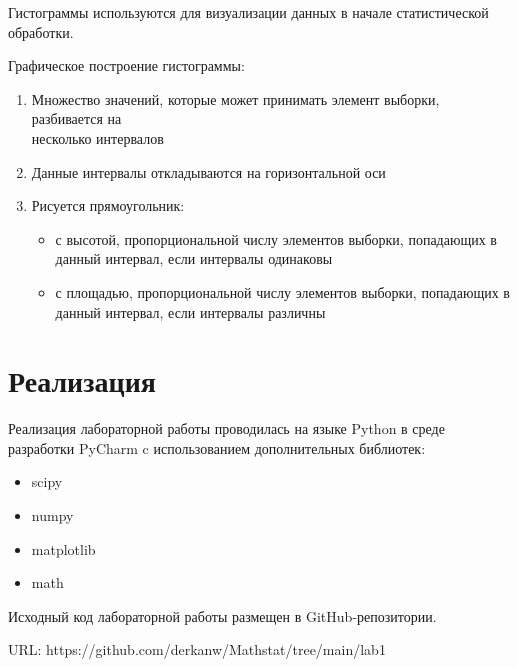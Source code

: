 ﻿\documentclass[12pt,a4paper]{article}
\begin{document}
Гистограммы используются для визуализации данных в начале статистической обработки.

Графическое построение гистограммы:
\begin{enumerate}
    \item Множество значений, которые может принимать элемент выборки, разбивается на\\несколько интервалов
    \item Данные интервалы откладываются на горизонтальной оси
    \item Рисуется прямоугольник:
        \begin{itemize}
            \item с высотой, пропорциональной числу элементов выборки, попадающих в данный интервал, если интервалы одинаковы
            \item с площадью, пропорциональной числу элементов выборки, попадающих в данный интервал, если интервалы различны
        \end{itemize}
\end{enumerate}

\section{Реализация}
Реализация лабораторной работы проводилась на языке Python в среде разработки PyCharm c использованием дополнительных библиотек:
\begin{itemize}
    \item scipy
    \item numpy
    \item matplotlib
    \item math
\end{itemize}

Исходный код лабораторной работы размещен в GitHub-репозитории.

URL: https://github.com/derkanw/Mathstat/tree/main/lab1
\end{document}
